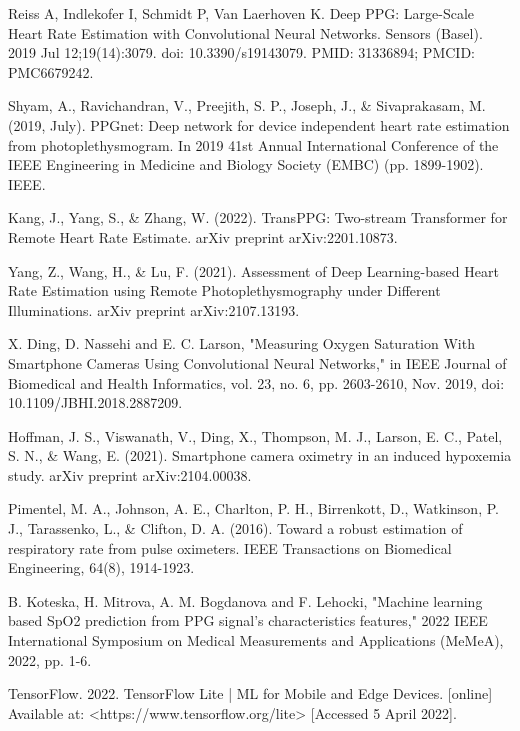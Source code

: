 \documentclass[conference]{IEEEtran}
\begin{document}
\begin{thebibliography}{00}
 Reiss A, Indlekofer I, Schmidt P, Van Laerhoven K. Deep PPG: Large-Scale Heart Rate Estimation with Convolutional Neural Networks. Sensors (Basel). 2019 Jul 12;19(14):3079. doi: 10.3390/s19143079. PMID: 31336894; PMCID: PMC6679242.

 Shyam, A., Ravichandran, V., Preejith, S. P., Joseph, J., \& Sivaprakasam, M. (2019, July). PPGnet: Deep network for device independent heart rate estimation from photoplethysmogram. In 2019 41st Annual International Conference of the IEEE Engineering in Medicine and Biology Society (EMBC) (pp. 1899-1902). IEEE.

 Kang, J., Yang, S., \& Zhang, W. (2022). TransPPG: Two-stream Transformer for Remote Heart Rate Estimate. arXiv preprint arXiv:2201.10873.

 Yang, Z., Wang, H., \& Lu, F. (2021). Assessment of Deep Learning-based Heart Rate Estimation using Remote Photoplethysmography under Different Illuminations. arXiv preprint arXiv:2107.13193.

 X. Ding, D. Nassehi and E. C. Larson, "Measuring Oxygen Saturation With Smartphone Cameras Using Convolutional Neural Networks," in IEEE Journal of Biomedical and Health Informatics, vol. 23, no. 6, pp. 2603-2610, Nov. 2019, doi: 10.1109/JBHI.2018.2887209.

 Hoffman, J. S., Viswanath, V., Ding, X., Thompson, M. J., Larson, E. C., Patel, S. N., \& Wang, E. (2021). Smartphone camera oximetry in an induced hypoxemia study. arXiv preprint arXiv:2104.00038.

 Pimentel, M. A., Johnson, A. E., Charlton, P. H., Birrenkott, D., Watkinson, P. J., Tarassenko, L., \& Clifton, D. A. (2016). Toward a robust estimation of respiratory rate from pulse oximeters. IEEE Transactions on Biomedical Engineering, 64(8), 1914-1923.

 B. Koteska, H. Mitrova, A. M. Bogdanova and F. Lehocki, "Machine learning based SpO2 prediction from PPG signal's characteristics features," 2022 IEEE International Symposium on Medical Measurements and Applications (MeMeA), 2022, pp. 1-6.

 TensorFlow. 2022. TensorFlow Lite | ML for Mobile and Edge Devices. [online] Available at: <https://www.tensorflow.org/lite> [Accessed 5 April 2022].


\end{thebibliography}
\end{document}
